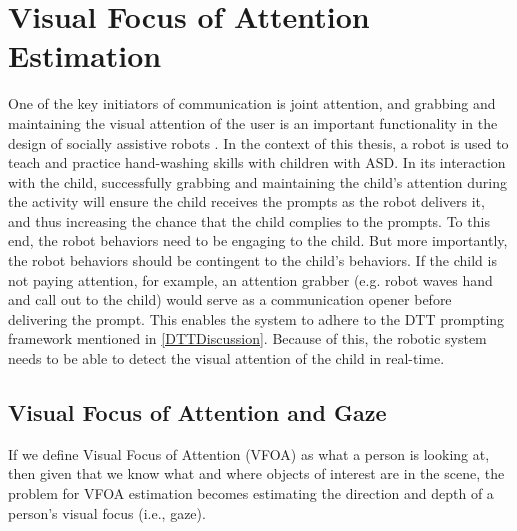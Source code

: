 \documentclass{ut-thesis}
\begin{document}
\section{Visual Focus of Attention Estimation}
One of the key initiators of communication is joint attention, and grabbing and maintaining the visual attention of the user is an important functionality in the design of socially assistive robots \cite{torta2012can}.  In the context of this thesis, a robot is used to teach and practice hand-washing skills with children with ASD.  In its interaction with the child, successfully grabbing and maintaining the child's attention during the activity will ensure the child receives the prompts as the robot delivers it, and thus increasing the chance that the child complies to the prompts.  To this end, the robot behaviors need to be engaging to the child.  But more importantly, the robot behaviors should be contingent to the child's behaviors.  If the child is not paying attention, for example, an attention grabber (e.g. robot waves hand and call out to the child) would serve as a communication opener before delivering the prompt.  This enables the system to adhere to the DTT prompting framework mentioned in \ref{DTTDiscussion}.  Because of this, the robotic system needs to be able to detect the visual attention of the child in real-time.

\subsection{Visual Focus of Attention and Gaze}
If we define Visual Focus of Attention (VFOA) as what a person is looking at, then given that we know what and where objects of interest are in the scene, the problem for VFOA estimation becomes estimating the direction and depth of a person's visual focus (i.e., gaze).
\end{document}
